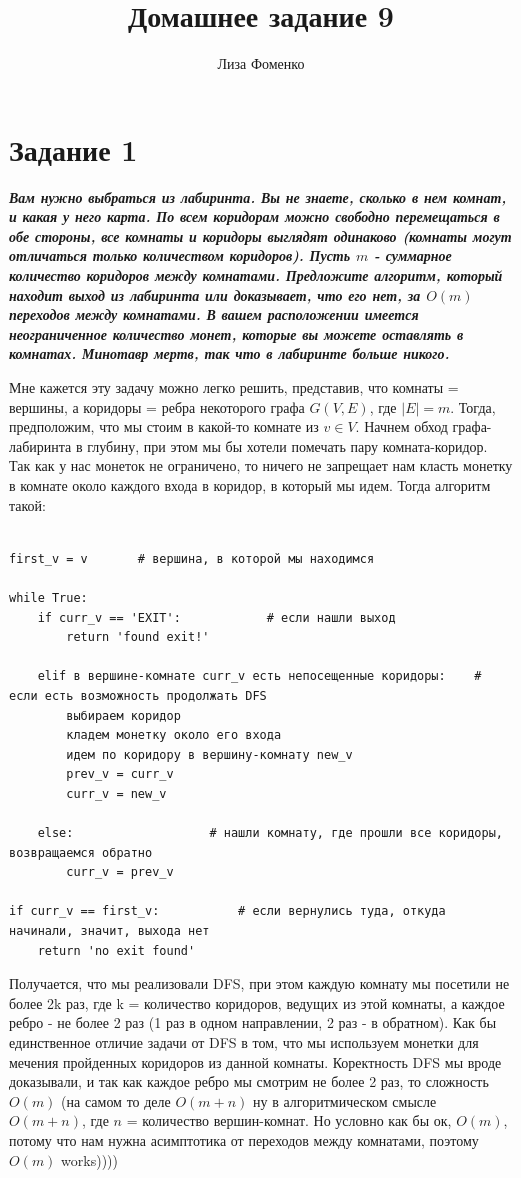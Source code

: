 \documentclass{article}
\title{Домашнее задание 9}
\author{Лиза Фоменко}
\date{}
\begin{document}
\maketitle

\section*{\textbf{Задание 1}} \textbf{\textit{Вам нужно выбраться из лабиринта. Вы не знаете, сколько в нем комнат, и какая у него карта. По всем коридорам можно свободно перемещаться в обе стороны, все комнаты и коридоры выглядят одинаково (комнаты могут отличаться только количеством коридоров). Пусть $m$ - суммарное количество коридоров между комнатами. Предложите алгоритм, который находит выход из лабиринта или доказывает, что его нет, за $O(m)$ переходов между комнатами. В вашем расположении имеется неограниченное количество монет, которые вы можете оставлять в комнатах. Минотавр мертв, так что в лабиринте больше никого.}}

Мне кажется эту задачу можно легко решить, представив, что комнаты = вершины, а коридоры = ребра некоторого графа $G(V,E)$, где $|E| = m$. Тогда, предположим, что мы стоим в какой-то комнате из $v \in V$. Начнем обход графа-лабиринта в глубину, при этом мы бы хотели помечать пару комната-коридор. Так как у нас монеток не ограничено, то ничего не запрещает нам класть монетку в комнате около каждого входа в коридор, в который мы идем. Тогда алгоритм такой: 

\begin{verbatim}

first_v = v       # вершина, в которой мы находимся

while True:
    if curr_v == 'EXIT':            # если нашли выход
        return 'found exit!'
        
    elif в вершине-комнате curr_v есть непосещенные коридоры:    # если есть возможность продолжать DFS
        выбираем коридор
        кладем монетку около его входа
        идем по коридору в вершину-комнату new_v
        prev_v = curr_v
        curr_v = new_v
        
    else:                   # нашли комнату, где прошли все коридоры, возвращаемся обратно
        curr_v = prev_v

if curr_v == first_v:           # если вернулись туда, откуда начинали, значит, выхода нет
    return 'no exit found'
\end{verbatim}

Получается, что мы реализовали DFS, при этом каждую комнату мы посетили не более 2k раз, где k = количество коридоров, ведущих из этой комнаты, а каждое ребро - не более 2 раз (1 раз в одном направлении, 2 раз - в обратном). Как бы единственное отличие задачи от DFS в том, что мы используем монетки для мечения пройденных коридоров из данной комнаты. Коректность DFS мы вроде доказывали, и так как каждое ребро мы смотрим не более 2 раз, то сложность $O(m)$ (на самом то деле  $O(m + n)$ ну в алгоритмическом смысле $O(m+n)$, где $n$ = количество вершин-комнат. Но условно как бы ок, $O(m)$, потому что нам нужна асимптотика от переходов между комнатами, поэтому $O(m)$ works))))
\end{document}
